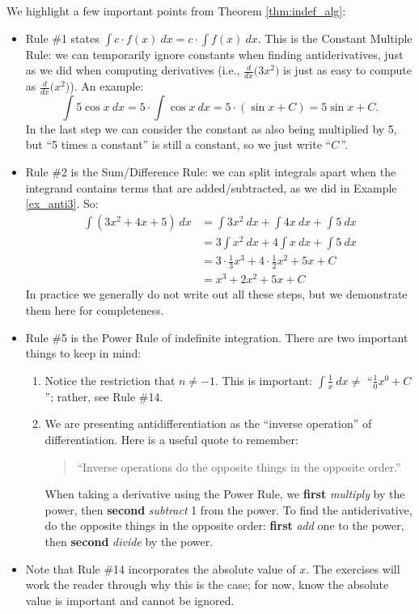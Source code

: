 We highlight a few important points from Theorem \ref{thm:indef_alg}:
\begin{itemize}
	\item		Rule \#1 states $\int c\cdot f(x)\ dx = c\cdot \int f(x)\ dx$. This is the Constant Multiple Rule:  we can temporarily ignore constants when finding antiderivatives, just as we did when computing derivatives (i.e., $\frac{d}{dx}\big(3x^2\big)$ is just as easy to compute as $\frac{d}{dx}\big(x^2\big)$). An example:
	$$\int 5\cos x\ dx = 5\cdot\int \cos x\ dx = 5\cdot (\sin x+C) = 5\sin x + C.$$
	In the last step we can consider the constant as also being multiplied by 5, but ``5 times a constant'' is still a constant, so we just write ``$C$\,''.
	\item		Rule \#2 is the Sum/Difference Rule: we can split integrals apart when the integrand contains terms that are added/subtracted, as we did in Example \ref{ex_anti3}. So:
	\begin{align*}
	\int(3x^2+4x+5)\ dx &= \int 3x^2\ dx + \int 4x\ dx + \int 5\ dx \\
											&= 3\int x^2\ dx + 4\int x\ dx + \int 5 \ dx\\
											&= 3\cdot \frac13x^3 + 4\cdot \frac12x^2+5x+C\\
											&= x^3+2x^2+5x+C
	\end{align*}
	In practice we generally do not write out all these steps, but we demonstrate them here for completeness.
	\item		Rule \#5 is the Power Rule of indefinite integration. There are two important things to keep in mind:
		\begin{enumerate}
		\item		Notice the restriction that $n\neq -1$. This is important: $\int \frac{1}{x}\ dx \neq $ ``$\frac{1}{0}x^0+C$''; rather, see Rule \#14.
		\item		We are presenting antidifferentiation as the ``inverse operation'' of differentiation. Here is a useful quote to remember:
		\begin{quote}%
		``Inverse operations do the opposite things in the opposite order.''
		\end{quote}
		When taking a derivative using the Power Rule, we \textbf{first} \textit{multiply} by the power, then \textbf{second} \textit{subtract} 1 from the power. To find the antiderivative, do the opposite things in the opposite order: \textbf{first} \textit{add} one to the power, then \textbf{second} \textit{divide} by the power.
			\end{enumerate}
		\item		Note that Rule \#14 incorporates the absolute value of $x$. The exercises will work the reader through why this is the case; for now, know the absolute value is important and cannot be ignored.
\end{itemize}

